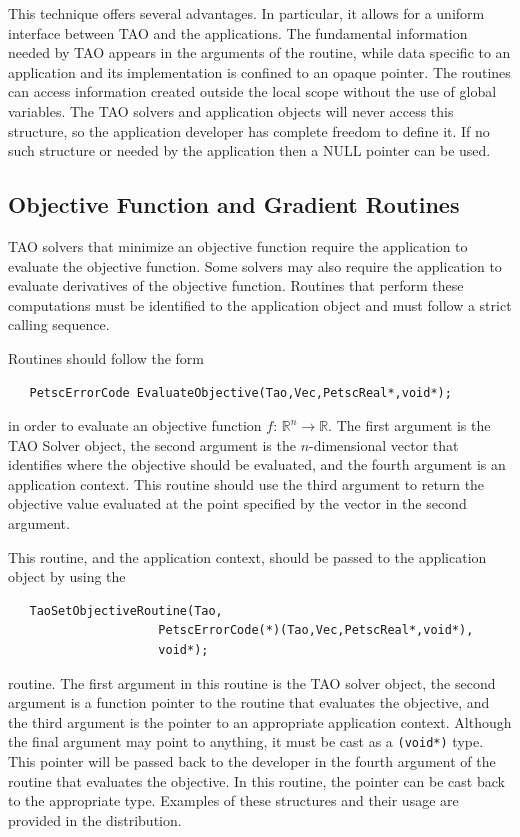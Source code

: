 \documentclass[]{book}
\newcommand{\R}{\mathbb R}
\renewcommand{\Re}{\R}
\begin{document}
This technique offers several advantages.
In particular, it allows for a uniform interface between TAO and 
the applications.   The fundamental information needed by TAO 
appears in the arguments of the routine, while data specific to an application
and its implementation is confined to an opaque pointer.
The routines can access information created outside the 
local scope without the use of global variables.
The TAO solvers and application objects will never access this structure, 
so the application developer has complete freedom to define it. If no 
such structure or needed by the application then a NULL pointer can be used.



\subsection{Objective Function and Gradient Routines}\label{sec_fghj}

TAO solvers that minimize an objective function require
the application to evaluate the objective function.  Some solvers
may also require the application to evaluate
derivatives of the objective function.  
Routines that perform these computations must be identified
to the application object and must follow a strict calling sequence.

Routines should follow the form
\begin{verbatim}
   PetscErrorCode EvaluateObjective(Tao,Vec,PetscReal*,void*);
\end{verbatim}
in order to evaluate an objective function $f: \, \Re^n \to \Re$. 
The first argument is the TAO Solver object, the second argument is the
$n$-dimensional vector that identifies where the objective should be evaluated, 
and the fourth argument is an application context.
This routine should use the third argument to return the objective value 
evaluated at the point
specified by the vector in the second argument.

This routine, and the application context, should be passed to the 
application object by using
the  %
\begin{verbatim}
   TaoSetObjectiveRoutine(Tao,
                     PetscErrorCode(*)(Tao,Vec,PetscReal*,void*),
                     void*);
\end{verbatim}
routine. 
The first argument in this routine is the TAO solver object, 
the second argument is a function pointer to the routine that 
evaluates the objective, and the third
argument is the pointer to an appropriate application context.  
Although the final argument may point to anything, it must be cast as a {\tt (void*)} type.
This pointer will be passed back to the developer in the fourth argument of the
routine that evaluates the objective.  In this routine, the pointer can be cast
back to the appropriate type.  Examples of these structures and their 
usage are provided in the distribution.
\end{document}
